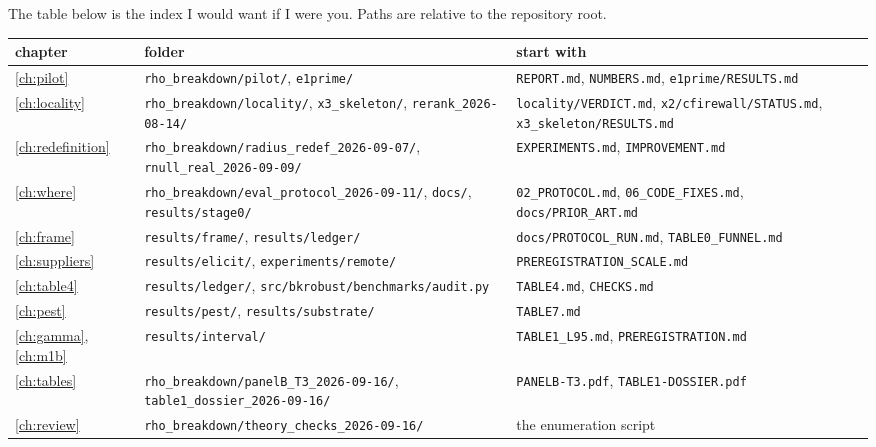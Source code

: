 The table below is the index I would want if I were you. Paths are relative to the repository root.

\begin{center}
\small
\begin{tabular}{@{}p{1.6cm}p{6.1cm}p{6.6cm}@{}}
\toprule
chapter & folder & start with \\
\midrule
\ref{ch:pilot} & \texttt{rho\_breakdown/pilot/}, \texttt{e1prime/} & \texttt{REPORT.md}, \texttt{NUMBERS.md}, \texttt{e1prime/RESULTS.md} \\
\ref{ch:locality} & \texttt{rho\_breakdown/\allowbreak{}locality/}, \texttt{x3\_skeleton/}, \texttt{rerank\_2026-08-14/} & \texttt{locality/VERDICT.md}, \texttt{x2/\allowbreak{}cfirewall/\allowbreak{}STATUS.md}, \texttt{x3\_skeleton/\allowbreak{}RESULTS.md} \\
\ref{ch:redefinition} & \texttt{rho\_breakdown/\allowbreak{}radius\_redef\_2026-09-07/}, \texttt{rnull\_real\_2026-09-09/} & \texttt{EXPERIMENTS.md}, \texttt{IMPROVEMENT.md} \\
\ref{ch:where} & \texttt{rho\_breakdown/\allowbreak{}eval\_protocol\_2026-09-11/}, \texttt{docs/}, \texttt{results/stage0/} & \texttt{02\_PROTOCOL.md}, \texttt{06\_CODE\_FIXES.md}, \texttt{docs/PRIOR\_ART.md} \\
\ref{ch:frame} & \texttt{results/frame/}, \texttt{results/ledger/} & \texttt{docs/PROTOCOL\_RUN.md}, \texttt{TABLE0\_FUNNEL.md} \\
\ref{ch:suppliers} & \texttt{results/elicit/}, \texttt{experiments/remote/} & \texttt{PREREGISTRATION\_SCALE.md} \\
\ref{ch:table4} & \texttt{results/ledger/}, \texttt{src/\allowbreak{}bkrobust/\allowbreak{}benchmarks/\allowbreak{}audit.py} & \texttt{TABLE4.md}, \texttt{CHECKS.md} \\
\ref{ch:pest} & \texttt{results/pest/}, \texttt{results/substrate/} & \texttt{TABLE7.md} \\
\ref{ch:gamma}, \ref{ch:m1b} & \texttt{results/interval/} & \texttt{TABLE1\_L95.md}, \texttt{PREREGISTRATION.md} \\
\ref{ch:tables} & \texttt{rho\_breakdown/\allowbreak{}panelB\_T3\_2026-09-16/}, \texttt{table1\_dossier\_2026-09-16/} & \texttt{PANELB-T3.pdf}, \texttt{TABLE1-DOSSIER.pdf} \\
\ref{ch:review} & \texttt{rho\_breakdown/\allowbreak{}theory\_checks\_2026-09-16/} & the enumeration script \\
\bottomrule
\end{tabular}
\end{center}

